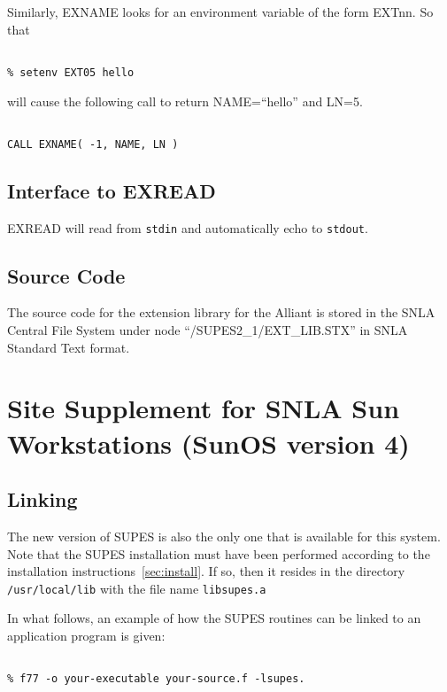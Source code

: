 Similarly,
EXNAME looks for an environment variable of the form
EXTnn.
So that
\begin{verbatim}

% setenv EXT05 hello

\end{verbatim}
will cause the following call to return NAME=``hello'' and LN=5.
\begin{verbatim}

CALL EXNAME( -1, NAME, LN )
\end{verbatim}

\subsection{Interface to EXREAD}
EXREAD will read from \verb+stdin+ and automatically echo to \verb+stdout+.

\subsection{Source Code}
The source code for the extension library for the Alliant
is stored in the SNLA Central File System under node
``/SUPES2\_1/EXT\_LIB.STX''
in SNLA Standard Text format.

\cleardoublepage
\section{Site Supplement for SNLA Sun Workstations (SunOS version 4)}

\subsection{Linking}
The new version of SUPES is also the only one that is available for this system.
Note that the SUPES installation must have been performed according to
the installation instructions~\ref{sec:install}.
If so,
then it resides in the directory \verb+/usr/local/lib+
with the file name \verb+libsupes.a+

In what follows,
an example of how the SUPES routines can be linked to an application program
is given:
\begin{verbatim}

% f77 -o your-executable your-source.f -lsupes.
\end{verbatim}

